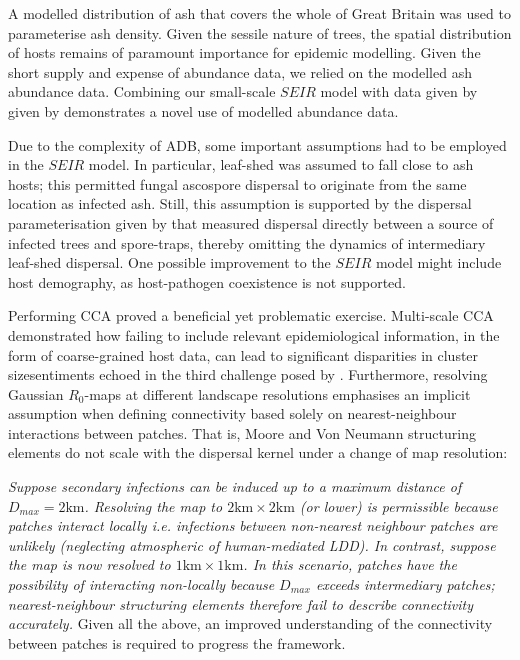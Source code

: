 A modelled distribution of ash that covers the whole of Great Britain was used to parameterise ash density.
Given the sessile nature of trees, the spatial distribution of hosts remains of paramount importance for epidemic modelling.
Given the short supply and expense of abundance data, we relied on the modelled ash abundance data.
Combining our small-scale $SEIR$ model with data given by given by \cite{hill.data} demonstrates a novel use of modelled abundance data.

Due to the complexity of ADB, some important assumptions had to be employed in the $SEIR$ model.
In particular, leaf-shed was assumed to fall close to ash hosts; 
this permitted fungal ascospore dispersal to originate from the same location as infected ash.
Still, this assumption is supported by the dispersal parameterisation given by \cite{grosdidier2018tracking} that measured dispersal directly between a source of infected trees and spore-traps, thereby omitting the dynamics of intermediary leaf-shed dispersal.
One possible improvement to the $SEIR$ model might include host demography, as host-pathogen coexistence is not supported.

Performing CCA proved a beneficial yet problematic exercise.
Multi-scale CCA demonstrated how failing to include relevant epidemiological information, in the form of coarse-grained host data, can lead to significant disparities in cluster size\textemdash sentiments echoed in the third challenge posed by \cite{13-challenges}.
Furthermore, resolving Gaussian $R_0$-maps at different landscape resolutions emphasises an implicit assumption when defining connectivity based solely on nearest-neighbour interactions between patches. 
That is, Moore and Von Neumann structuring elements do not scale with the dispersal kernel under a change of map resolution:

\textit{Suppose secondary infections can be induced up to a maximum distance of $D_{max} = 2\mathrm{km}$.
Resolving the map to $\mathrm{2km \times 2km}$ (or lower) is permissible because patches interact locally i.e. infections between non-nearest neighbour patches are unlikely (neglecting atmospheric of human-mediated LDD).
In contrast, suppose the map is now resolved to $\mathrm{1km \times 1km}$.
In this scenario, patches have the possibility of interacting non-locally because $D_{max}$ exceeds intermediary patches;
nearest-neighbour structuring elements therefore fail to describe connectivity accurately.}
Given all the above, an improved understanding of the connectivity between patches is required to progress the framework.

